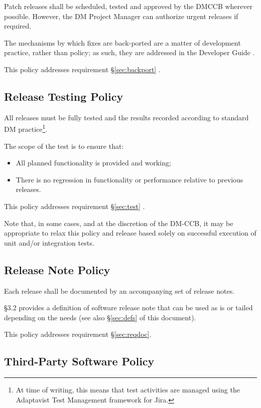Patch releases shall be scheduled, tested and approved by the DMCCB wherever possible.
However, the DM Project Manager can authorize urgent releases if required.

The mechanisms by which fixes are back-ported are a matter of development practice, rather than policy; as such, they are addressed in the Developer Guide \citep{DevGuide}.

This policy addresses requirement \S\ref{sec:backport} .


\subsection{Release Testing Policy} \label{sec:testpolicy}

All releases must be fully tested and the results recorded according to standard DM practice\footnote{At time of writing, this means that test activities are managed using the Adaptavist Test Management framework for Jira.}.

The scope of the test is to ensure that:

\begin{itemize}
\item All planned functionality is provided and working;
\item There is no regression in functionality or performance relative to previous releases.
\end{itemize}

This policy addresses requirement \S\ref{sec:test} .

Note that, in some cases, and at the discretion of the DM-CCB, it may be appropriate to relax this policy and release based solely on successful execution of unit and/or integration tests.


\subsection{Release Note Policy} \label{sec:notepolicy}

Each release shall be documented by an accompanying set of release notes.

 \S3.2 provides a definition of software release note that can be used as is or tailed depending on the needs (see also \S\ref{sec:defs} of this document).

This policy addresses requirement \S\ref{sec:reqdoc}.


\subsection{Third-Party Software Policy} \label{sec:thirdpolicy}

